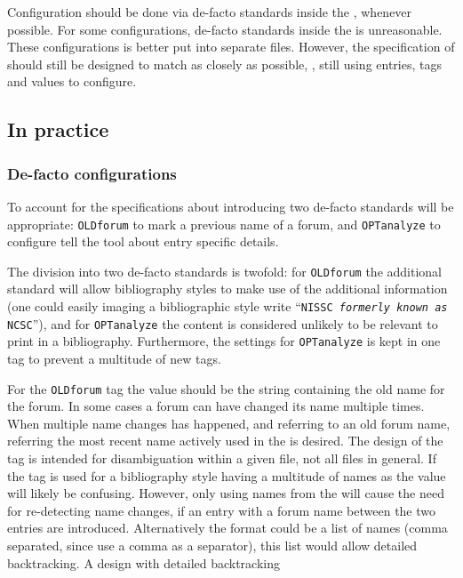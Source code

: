 Configuration should be done via de-facto standards inside the
, whenever possible.  For some configurations, de-facto
standards inside the  is unreasonable.  These configurations
is better put into separate files.  However, the specification of
should still be designed to match {\bibtex} as closely as possible,
\ie, still using entries, tags and values to configure.


\subsection{In practice}

\subsubsection{De-facto configurations}

To account for the specifications about introducing two de-facto
standards will be appropriate: \texttt{OLDforum} to mark a previous
name of a forum, and \texttt{OPTanalyze} to configure tell the tool
about entry specific details.

The division into two de-facto standards is twofold: for
\texttt{OLDforum} the additional standard will allow bibliography
styles to make use of the additional information (one could easily
imaging a bibliographic style write ``\texttt{NISSC \textit{formerly
    known as} NCSC}''), and for \texttt{OPTanalyze} the content is
considered unlikely to be relevant to print in a bibliography.
Furthermore, the settings for \texttt{OPTanalyze} is kept in one tag
to prevent a multitude of new tags.


For the \texttt{OLDforum} tag the value should be the string containing the
old name for the forum.  In some cases a forum can have changed its
name multiple times.  When multiple name changes has happened, and
referring to an old forum name, referring the most recent name
actively used in the  is desired.  The design of the tag is
intended for disambiguation within a given file, not all files in
general.  If the tag is used for a bibliography style having a
multitude of names as the value will likely be confusing.  However,
only using names from the  will cause the need for
re-detecting name changes, if an entry with a forum name between the
two entries are introduced.  Alternatively the format could be a list
of names (comma separated, since {\bibtex} use a comma as a separator),
this list would allow detailed backtracking.  A design with detailed
backtracking

